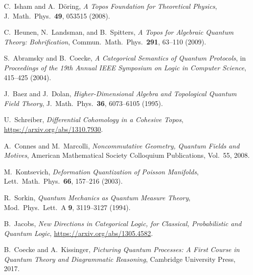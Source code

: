 \documentclass[12pt]{article}
\begin{document}
\bigskip


\begin{thebibliography}{99}

C.~Isham and A.~Döring,
\newblock \emph{A Topos Foundation for Theoretical Physics},
\newblock J.\ Math.\ Phys.\ \textbf{49}, 053515 (2008).

C.~Heunen, N.~Landsman, and B.~Spitters,
\newblock \emph{A Topos for Algebraic Quantum Theory: Bohrification},
\newblock Commun.\ Math.\ Phys.\ \textbf{291}, 63--110 (2009).

S.~Abramsky and B.~Coecke,
\newblock \emph{A Categorical Semantics of Quantum Protocols},
\newblock in \emph{Proceedings of the 19th Annual IEEE Symposium on Logic in Computer Science}, 415--425 (2004).

J.~Baez and J.~Dolan,
\newblock \emph{Higher-Dimensional Algebra and Topological Quantum Field Theory},
\newblock J.\ Math.\ Phys.\ \textbf{36}, 6073--6105 (1995).

U.~Schreiber,
\newblock \emph{Differential Cohomology in a Cohesive Topos},
\newblock \url{https://arxiv.org/abs/1310.7930}.

A.~Connes and M.~Marcolli,
\newblock \emph{Noncommutative Geometry, Quantum Fields and Motives},
\newblock American Mathematical Society Colloquium Publications, Vol.~55, 2008.

M.~Kontsevich,
\newblock \emph{Deformation Quantization of Poisson Manifolds},
\newblock Lett.\ Math.\ Phys.\ \textbf{66}, 157--216 (2003).

R.~Sorkin,
\newblock \emph{Quantum Mechanics as Quantum Measure Theory},
\newblock Mod.\ Phys.\ Lett.\ A \textbf{9}, 3119--3127 (1994).

B.~Jacobs,
\newblock \emph{New Directions in Categorical Logic, for Classical, Probabilistic and Quantum Logic},
\newblock \url{https://arxiv.org/abs/1305.4582}.

B.~Coecke and A.~Kissinger,
\newblock \emph{Picturing Quantum Processes: A First Course in Quantum Theory and Diagrammatic Reasoning},
\newblock Cambridge University Press, 2017.

\end{thebibliography}
\end{document}
